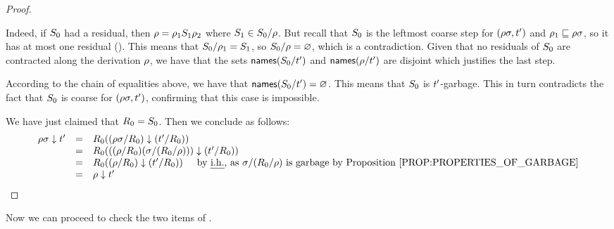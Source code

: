 \begin{proof}
\begin{enumerate}
  Indeed, if $S_0$ had a residual, then $\rho = \rho_1S_1\rho_2$ where $S_1 \in S_0/\rho$.
  But recall that $S_0$ is the leftmost coarse step for $(\rho\sigma,t')$ and
  $\rho_1 \sqsubseteq \rho\sigma$, so it has at most one residual ().
  This means that $S_0/\rho_1 = S_1$, so $S_0/\rho = \varnothing$, which is a contradiction.
  Given that no residuals of $S_0$ are contracted along the derivation $\rho$,
  we have that the sets $\mathsf{names}(S_0/t')$ and $\mathsf{names}(\rho/t')$ are disjoint
  which justifies the last step.
  
  According to the chain of equalities above, we have that $\mathsf{names}(S_0/t') = \varnothing$.
  This means that $S_0$ is $t'$-garbage.
  This in turn contradicts the fact that $S_0$ is coarse for $(\rho\sigma,t')$,
  confirming that this case is impossible.
\end{enumerate}
We have just claimed that $R_0 = S_0$. Then we conclude as follows:
\[
  \begin{array}{rcll}
  \redseq\redseqtwo \sieve \tm'
  & = & \redex_0((\redseq\redseqtwo/\redex_0) \sieve (\tm'/\redex_0)) \\
  & = & \redex_0(((\redseq/\redex_0)(\redseqtwo/(\redex_0/\redseq))) \sieve (\tm'/\redex_0)) \\
  & = & \redex_0((\redseq/\redex_0) \sieve (\tm'/\redex_0)) \HS\text{by \ih, as $\redseqtwo/(\redex_0/\redseq)$ is garbage by \rprop{properties_of_garbage}} \\
  & = & \redseq \sieve \tm' \\
  \end{array}
\]
\end{proof}

Now we can proceed to check the two items of .


